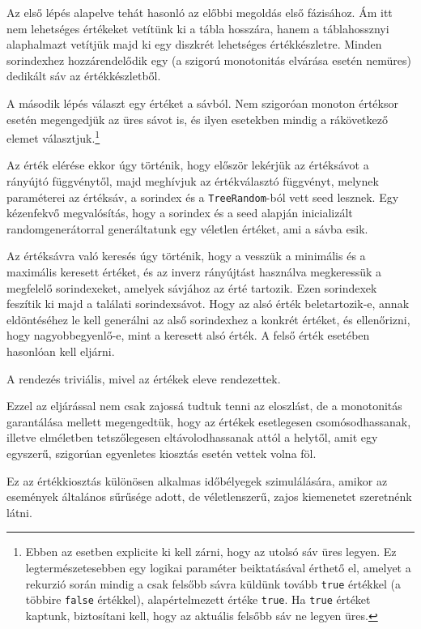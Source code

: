 \documentclass[
    parspace, %
    noindent, %
]{elteiktdk}[2023/10/30]
\begin{document}
Az első lépés alapelve tehát hasonló az előbbi megoldás első fázisához.
Ám itt nem lehetséges értékeket vetítünk ki a tábla hosszára,
hanem a táblahossznyi alaphalmazt vetítjük majd ki egy diszkrét lehetséges értékkészletre.
Minden sorindexhez hozzárendelődik egy (a szigorú monotonitás elvárása esetén nemüres)
dedikált sáv az értékkészletből.

A második lépés választ egy értéket a sávból.
Nem szigoróan monoton értéksor esetén megengedjük az üres sávot is,
és ilyen esetekben mindig a rákövetkező elemet választjuk.\footnote{
  Ebben az esetben explicite ki kell zárni, hogy az utolsó sáv üres legyen.
  Ez legtermészetesebben egy logikai paraméter beiktatásával érthető el,
  amelyet a rekurzió során mindig a csak felsőbb sávra küldünk tovább \texttt{true} értékkel
  (a többire \texttt{false} értékkel),
  alapértelmezett értéke \texttt{true}.
  Ha \texttt{true} értéket kaptunk, biztosítani kell, hogy az aktuális felsőbb sáv ne legyen üres.
}

Az érték elérése ekkor úgy történik, hogy először lekérjük az értéksávot a rányújtó függvénytől,
majd meghívjuk az értékválasztó függvényt,
melynek paraméterei az értéksáv, a sorindex és a \texttt{TreeRandom}-ból vett seed lesznek.
Egy kézenfekvő megvalósítás,
hogy a sorindex és a seed alapján inicializált randomgenerátorral
generáltatunk egy véletlen értéket, ami a sávba esik.

Az értéksávra való keresés úgy történik, hogy a vesszük a minimális és a maximális keresett értéket,
és az inverz rányújtást használva megkeressük a megfelelő sorindexeket, amelyek sávjához az érté tartozik.
Ezen sorindexek feszítik ki majd a találati sorindexsávot.
Hogy az alsó érték beletartozik-e, annak eldöntéséhez le kell generálni
az alső sorindexhez a konkrét értéket, és ellenőrizni, hogy nagyobbegyenlő-e,
mint a keresett alsó érték.
A felső érték esetében hasonlóan kell eljárni.

A rendezés triviális, mivel az értékek eleve rendezettek.

Ezzel az eljárással nem csak zajossá tudtuk tenni az eloszlást,
de a monotonitás garantálása mellett megengedtük,
hogy az értékek esetlegesen csomósodhassanak,
illetve elméletben tetszőlegesen eltávolodhassanak attól a helytől,
amit egy egyszerű, szigorúan egyenletes kiosztás esetén vettek volna föl.

Ez az értékkiosztás különösen alkalmas időbélyegek szimulálására,
amikor az események általános sűrűsége adott,
de véletlenszerű, zajos kiemenetet szeretnénk látni.
\end{document}
